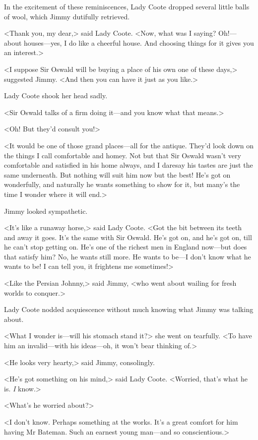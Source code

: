 In the excitement of these reminiscences, Lady Coote dropped several little balls of wool, which Jimmy dutifully retrieved.

<Thank you, my dear,> said Lady Coote. <Now, what was I saying? Oh!—about houses—yes, I do like a cheerful house. And choosing things for it gives you an interest.>

<I suppose Sir Oswald will be buying a place of his own one of these days,> suggested Jimmy. <And then you can have it just as you like.>

Lady Coote shook her head sadly.

<Sir Oswald talks of a firm doing it—and you know what that means.>

<Oh! But they'd consult you!>

<It would be one of those grand places—all for the antique. They'd look down on the things I call comfortable and homey. Not but that Sir Oswald wasn't very comfortable and satisfied in his home always, and I daresay his tastes are just the same underneath. But nothing will suit him now but the best! He's got on wonderfully, and naturally he wants something to show for it, but many's the time I wonder where it will end.>

Jimmy looked sympathetic.

<It's like a runaway horse,> said Lady Coote. <Got the bit between its teeth and away it goes. It's the same with Sir Oswald. He's got on, and he's got on, till he can't stop getting on. He's one of the richest men in England now—but does that satisfy him? No, he wants still more. He wants to be—I don't know what he wants to be! I can tell you, it frightens me sometimes!>

<Like the Persian Johnny,> said Jimmy, <who went about wailing for fresh worlds to conquer.>

Lady Coote nodded acquiescence without much knowing what Jimmy was talking about.

<What I wonder is—will his stomach stand it?> she went on tearfully. <To have him an invalid—with his ideas—oh, it won't bear thinking of.>

<He looks very hearty,> said Jimmy, consolingly.

<He's got something on his mind,> said Lady Coote. <Worried, that's what he is. \emph{I} know.>

<What's he worried about?>

<I don't know. Perhaps something at the works. It's a great comfort for him having Mr Bateman. Such an earnest young man—and so conscientious.>

